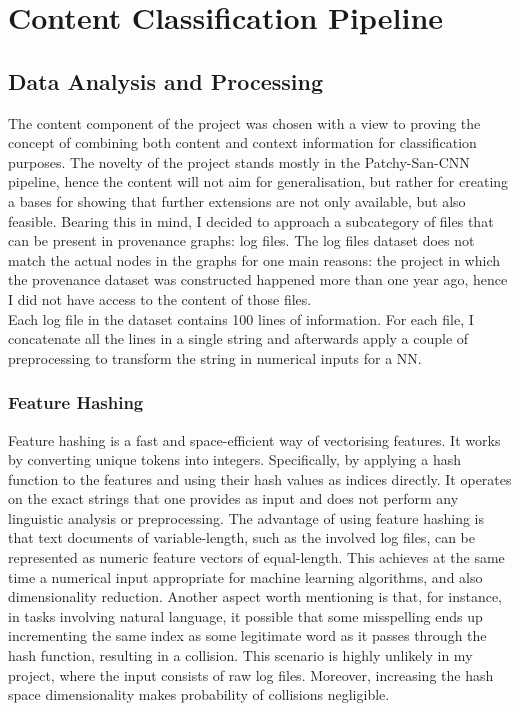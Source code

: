 \section{Content Classification Pipeline}
\subsection{Data Analysis and Processing}

The content component of the project was chosen with a view to proving the concept of combining both content and context information for classification purposes. The novelty of the project stands mostly in the Patchy-San-CNN pipeline, hence the content will not aim for generalisation, but rather for creating a bases for showing that further extensions are not only available, but also feasible. Bearing this in mind, I decided to approach a subcategory of files that can be present in provenance graphs: log files. The log files dataset does not match the actual nodes in the graphs for one main reasons: the project in which the provenance dataset was constructed happened more than one year ago, hence I did not have access to the content of those files. \\

Each log file in the dataset contains 100 lines of information. For each file, I concatenate all the lines in a single string and afterwards apply a couple of preprocessing to transform the string in numerical inputs for a NN. \\

\subsubsection*{Feature Hashing}

Feature hashing is a fast and space-efficient way of vectorising features. It works by converting unique tokens into integers. Specifically, by applying a hash function to the features and using their hash values as indices directly. It operates on the exact strings that one provides as input and does not perform any linguistic analysis or preprocessing. The advantage of using feature hashing is that text documents of variable-length, such as the involved log files, can be represented as numeric feature vectors of equal-length. This achieves at the same time a numerical input appropriate for machine learning algorithms, and also dimensionality reduction. Another aspect worth mentioning is that, for instance, in tasks involving natural language, it possible that some misspelling ends up incrementing the same index as some legitimate word as it passes through the hash function, resulting in a collision. This scenario is highly unlikely in my project, where the input consists of raw log files. Moreover, increasing the hash space dimensionality makes probability of collisions negligible.\\

